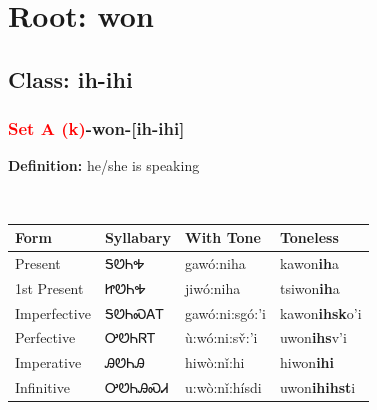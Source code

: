 \needspace{4in}
\section*{Root: won}
\nopagebreak
{}
\needspace{3in}
\subsection*{Class: ih-ihi}
\nopagebreak
\needspace{2in}
\subsubsection*{\textcolor{Red}{Set A (k)}{-}\textbf{won}{-}[ih-ihi]}
\nopagebreak
\textbf{Definition: } he/she is speaking
\\[0.5em]
\begin{tabularx}{\textwidth}{l X X X}%
\toprule%
\textbf{Form}&\textbf{Syllabary}&\textbf{With Tone}&\textbf{Toneless}\\%
\midrule%
Present&ᎦᏬᏂᎭ&gawó:niha&kawon\textbf{ih}a\\%
1st Present&ᏥᏬᏂᎭ&jiwó:niha&tsiwon\textbf{ih}a\\%
Imperfective&ᎦᏬᏂᏍᎪᎢ&gawó:ni:sgó:’i&kawon\textbf{ihsk}o'i\\%
Perfective&ᎤᏬᏂᏒᎢ&ù:wó:ni:sv̌:’i&uwon\textbf{ihs}v'i\\%
Imperative&ᎯᏬᏂᎯ&hiwò:nǐ:hi&hiwon\textbf{ihi}\\%
Infinitive&ᎤᏬᏂᎯᏍᏗ&u:wò:nǐ:hísdi&uwon\textbf{ihihst}i\\%
\bottomrule%
\end{tabularx}
\\[1em]